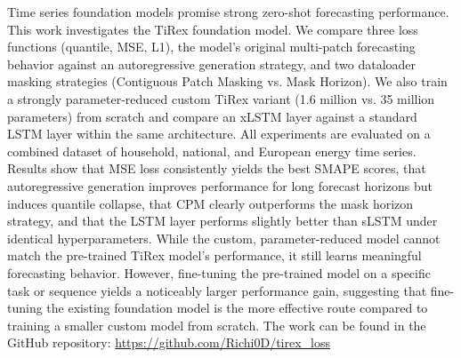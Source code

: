 \documentclass[a4paper,oneside,10pt,ngerman,english]{scrartcl}
\begin{document}


\maketitle


\cleardoubleoddpage
\tableofcontents




\cleardoubleoddpage


Time series foundation models promise strong zero-shot forecasting performance. This work investigates the TiRex foundation model. We compare three loss functions (quantile, MSE, L1), the model's original multi-patch forecasting behavior against an autoregressive generation strategy, and two dataloader masking strategies (Contiguous Patch Masking vs. Mask Horizon). We also train a strongly parameter-reduced custom TiRex variant (1.6 million vs. 35 million parameters) from scratch and compare an xLSTM layer against a standard LSTM layer within the same architecture. All experiments are evaluated on a combined dataset of household, national, and European energy time series. Results show that MSE loss consistently yields the best SMAPE scores, that autoregressive generation improves performance for long forecast horizons but induces quantile collapse, that CPM clearly outperforms the mask horizon strategy, and that the LSTM layer performs slightly better than sLSTM under identical hyperparameters. While the custom, parameter-reduced model cannot match the pre-trained TiRex model's performance, it still learns meaningful forecasting behavior. However, fine-tuning the pre-trained model on a specific task or sequence yields a noticeably larger performance gain, suggesting that fine-tuning the existing foundation model is the more effective route compared to training a smaller custom model from scratch. The work can be found in the GitHub repository:  \url{https://github.com/Richi0D/tirex_loss}
\end{document}
